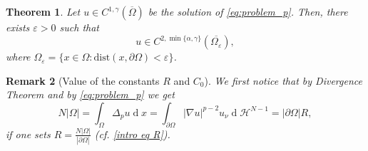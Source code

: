 \documentclass[10pt,a4paper, reqno]{amsart}
\numberwithin{equation}{section}
\newtheorem{teo}{Theorem}[section]
\newtheorem{rem}[teo]{Remark}
\renewcommand{\d}[1]{\ensuremath{\operatorname{d}\!{#1}}}
\begin{document}
\begin{teo}\label{thm regularity C2}
Let $u\in C^{1,\gamma}(\overline{\Omega})$ be the solution of \eqref{eq:problem_p}. Then, there exists $\varepsilon>0$ such that
\[
    u\in C^{2,\min\{\alpha,\gamma \}}(\overline{\Omega_\varepsilon}), 
\]
where $\Omega_\varepsilon=\{x\in\Omega: \mathrm{dist}(x,\partial\Omega)<\varepsilon\}$.
\end{teo}



\begin{rem}[Value of the constants $R$ and $C_0$]
    We first notice that by Divergence Theorem and by \eqref{eq:problem_p} we get
    \begin{equation*}
        N|\Omega| = \int_\Omega \Delta_p u \d{x} = \int_{\partial\Omega} |\nabla u|^{p-2} u_\nu \d{}\mathcal{H}^{N-1} = |\partial\Omega|R,
    \end{equation*}
    if one sets $R=\frac{N|\Omega|}{|\partial\Omega|}$ (cf. \eqref{intro eq R}).


\end{rem}
\end{document}
